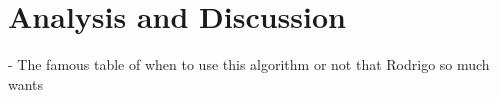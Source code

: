 
\chapter{Analysis and Discussion}\label{ch:analysis}

- The famous table of when to use this algorithm or not that Rodrigo so much wants
